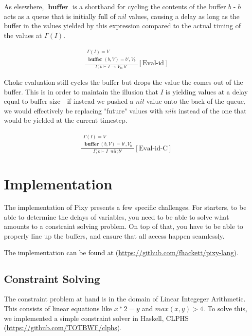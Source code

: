 \documentclass{scrartcl}
\DeclareMathOperator{\ceval}{\overset{C}{\rightarrow}}
\DeclareMathOperator{\buffer}{\mathbf{buffer}}
\begin{document}
    As elsewhere, $\buffer$ is a shorthand for cycling the contents of the buffer $b$ - $b$ acts as a queue that is initially full of $nil$ values, causing a delay as long as the buffer in the values yielded by this expression compared to the actual timing of the values at $\Gamma(I)$.
    
    \begin{align*}
    \frac{
        \begin{matrix}
        \Gamma(I) = V \\
        \buffer(b, V) = b', V_b
        \end{matrix}
    }{
        \Gamma, b \vdash I \rightarrow V_b; b'
    }[\text{Eval-id}]
    \end{align*}
    
    Choke evaluation still cycles the buffer but drops the value the comes out of the buffer. This is in order to maintain the illusion that $I$ is yielding values at a delay equal to buffer size - if instead we pushed a $nil$ value onto the back of the queue, we would effectively be replacing "future" values with $nil$s instead of the one that would be yielded at the current timestep.
    
    \begin{align*}
    \frac{
        \begin{matrix}
        \Gamma(I) = V \\
        \buffer(b, V) = b', V_b
        \end{matrix}
    }{
        \Gamma, b \vdash I \ceval nil; b'
    }[\text{Eval-id-C}]
    \end{align*}
    
    \section{Implementation}
    
    The implementation of Pixy presents a few specific challenges. For starters, 
    to be able to determine the delays of variables, you need to be able to 
    solve what amounts to a constraint solving problem. On top of that, you
    have to be able to properly line up the buffers, and ensure that all access happen seamlessly.

    The implementation can be found at (\url{https://github.com/fhackett/pixy-lang}).

    \subsection{Constraint Solving}
    The constraint problem at hand is in the domain of Linear Integeger Arithmetic. This consists
    of linear equations like $x * 2 = y$ and $max(x,y) > 4$. To solve this, we implemented a 
    simple constraint solver in Haskell, CLPHS (\url{https://github.com/TOTBWF/clphs}).
\end{document}
